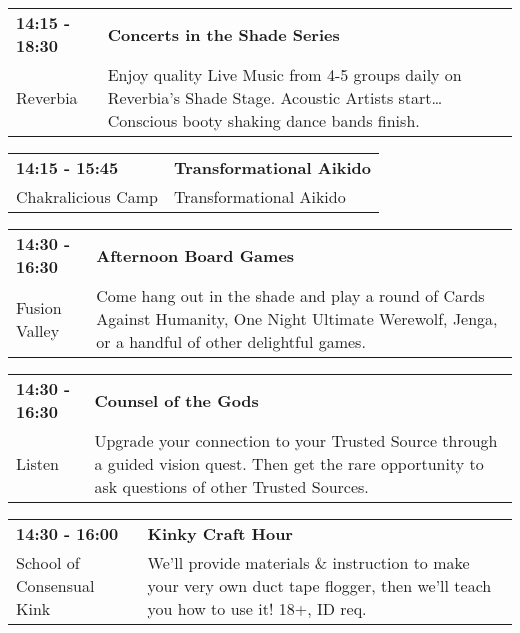 \begin{tabular}{ p{1in} p{2.2in} }
    \textbf{14:15 - 18:30} & \textbf{Concerts in the Shade Series} \\
    Reverbia \newline  & Enjoy quality Live Music from 4-5 groups daily on Reverbia's Shade Stage.  Acoustic Artists start\ldots Conscious booty shaking dance bands finish. \\
    \hline 
\end{tabular}
    
\begin{tabular}{ p{1in} p{2.2in} }
    \textbf{14:15 - 15:45} & \textbf{Transformational Aikido} \\
    Chakralicious Camp \newline  & Transformational Aikido \\
    \hline 
\end{tabular}
    
\begin{tabular}{ p{1in} p{2.2in} }
    \textbf{14:30 - 16:30} & \textbf{Afternoon Board Games} \\
    Fusion Valley \newline  & Come hang out in the shade and play a round of Cards Against Humanity, One Night Ultimate Werewolf, Jenga, or a handful of other delightful games. \\
    \hline 
\end{tabular}
    
\begin{tabular}{ p{1in} p{2.2in} }
    \textbf{14:30 - 16:30} & \textbf{Counsel of the Gods} \\
    Listen \newline  & Upgrade your connection to your Trusted Source through a guided vision quest. Then get the rare opportunity to ask questions of other Trusted Sources. \\
    \hline 
\end{tabular}
    
\begin{tabular}{ p{1in} p{2.2in} }
    \textbf{14:30 - 16:00} & \textbf{Kinky Craft Hour} \\
    School of Consensual Kink \newline  & We'll provide materials \& instruction to make your very own duct tape flogger, then we'll teach you how to use it! 18+, ID req. \\
    \hline 
\end{tabular}
    
